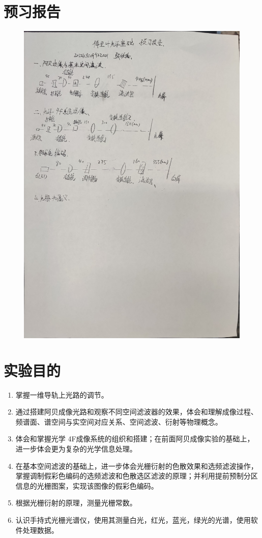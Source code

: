 \documentclass[11pt]{article}
\begin{document}
\section{预习报告}
\begin{figure}[H]
    \centering
    \includegraphics[width=13.5cm]{Fig/0-预习报告.jpg}
\end{figure}

\section{实验目的}

\begin{enumerate}
    \item 掌握一维导轨上光路的调节。
    \item 通过搭建阿贝成像光路和观察不同空间滤波器的效果，体会和理解成像过程、频谱面、谱空间与实空间对应关系、空间滤波、衍射等物理概念。
    \item 体会和掌握光学 4F成像系统的组织和搭建；在前面阿贝成像实验的基础上，进一步体会更为复杂的光学信息处理。
    \item 在基本空间滤波的基础上，进一步体会光栅衍射的色散效果和选频滤波操作，掌握调制假彩色编码的选频滤波和色散选区滤波的原理；并利用提前预制分区信息的光栅图案，实现该图像的假彩色编码。
    \item 根据光栅衍射的原理，测量光栅常数。
    \item 认识手持式光栅光谱仪，使用其测量白光，红光，蓝光，绿光的光谱，使用软件处理数据。
\end{enumerate}
\end{document}
